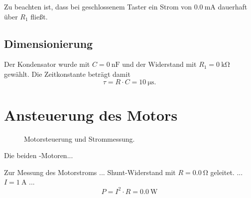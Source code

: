 \documentclass[12pt,fleqn,parskip=half,twoside,toc=index,headings=small,a4paper]{scrreprt}
\begin{document}
	Zu beachten ist, dass bei geschlossenem Taster ein Strom von $\SI{0.0}{\mA}$ dauerhaft über $R_{1}$ fließt.
	\subsection*{Dimensionierung}
	Der Kondensator wurde mit $C=\SI{0}{\nano\farad}$ und der Widerstand mit $R_1 = \SI{0}{\kilo\ohm}$ gewählt.
	Die Zeitkonstante beträgt damit
	\begin{equation}
		\tau = R \cdot C = \SI{10}{\us}.
	\end{equation}
	\section{Ansteuerung des Motors}
	\begin{figure}[h!]
		\centering
		\caption{Motorsteuerung und Strommessung.}\label{Motor}
	\end{figure}
	Die beiden -Motoren... 
	
	Zur Messung des Motorstroms ... Shunt-Widerstand mit $R=\SI{0.0}{\ohm}$ geleitet.
	... $I=\SI{1}{\A}$ ...
	\begin{equation}
		P=I^2\cdot R=\SI{0.0}{\W}
	\end{equation}
\end{document}
